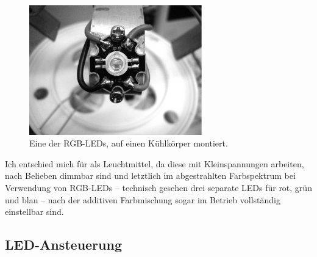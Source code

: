 \documentclass[12pt,a4paper,notitlepage]{article}
\begin{document}
\begin{figure}
\centering
\includegraphics[width=7.5cm]{images/led_closeup.eps}
\caption{Eine der RGB-LEDs, auf einen Kühlkörper montiert.}
\label{rgb_led}
\end{figure}

Ich entschied mich für  als Leuchtmittel, da diese mit Kleinspannungen arbeiten, nach Belieben dimmbar sind und letztlich im abgestrahlten Farbspektrum bei Verwendung von RGB-LEDs -- technisch gesehen drei separate LEDs für rot, grün und blau -- nach der additiven Farbmischung\cite{WP10} sogar im Betrieb vollständig einstellbar sind.

\subsection{LED-Ansteuerung}
\end{document}
